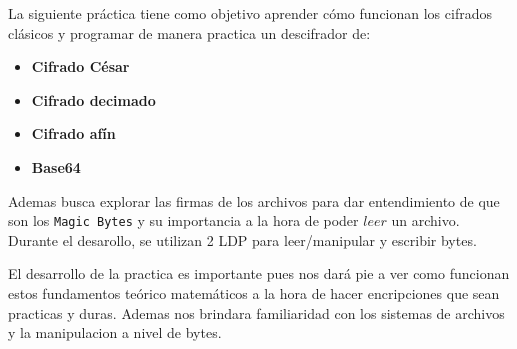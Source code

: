 La siguiente práctica tiene como objetivo aprender cómo funcionan los cifrados clásicos y programar
de manera practica un descifrador de:

\begin{itemize}
    \item \textbf{Cifrado César}
    \item \textbf{Cifrado decimado}
    \item \textbf{Cifrado afín}
    \item \textbf{Base64}
\end{itemize}

Ademas busca explorar las firmas de los archivos para dar entendimiento de que son los
\texttt{Magic Bytes} y su importancia a la hora de poder $leer$ un archivo. Durante el
desarollo, se utilizan 2 LDP para leer/manipular y escribir bytes. \vspace{.3cm}

El desarrollo de la practica es importante pues nos dará pie a ver como funcionan estos
fundamentos teórico matemáticos a la hora de hacer encripciones que sean practicas y duras.
Ademas nos brindara familiaridad con los sistemas de archivos y la manipulacion a nivel de bytes.
\vspace{.3cm}
